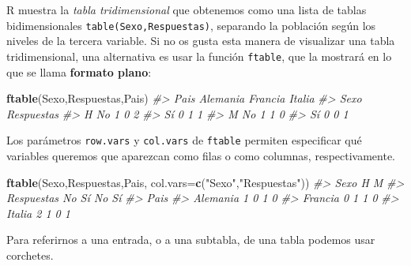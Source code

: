 \documentclass[
]{book}
\newenvironment{Shaded}{\begin{snugshade}}{\end{snugshade}}
\newcommand{\CommentTok}[1]{\textcolor[rgb]{0.56,0.35,0.01}{\textit{#1}}}
\newcommand{\DataTypeTok}[1]{\textcolor[rgb]{0.13,0.29,0.53}{#1}}
\newcommand{\KeywordTok}[1]{\textcolor[rgb]{0.13,0.29,0.53}{\textbf{#1}}}
\newcommand{\NormalTok}[1]{#1}
\newcommand{\StringTok}[1]{\textcolor[rgb]{0.31,0.60,0.02}{#1}}
\theoremstyle{definition}
\theoremstyle{definition}
\theoremstyle{definition}
\theoremstyle{remark}
\begin{document}
R muestra la \emph{tabla tridimensional} que obtenemos como una lista de tablas bidimensionales \texttt{table(Sexo,Respuestas)}, separando la población según los niveles de la tercera variable. Si no os gusta esta manera de visualizar una tabla tridimensional, una alternativa es usar la función \texttt{ftable}, que la mostrará en lo que se llama \textbf{formato plano}:

\begin{Shaded}
\begin{Highlighting}[]
\KeywordTok{ftable}\NormalTok{(Sexo,Respuestas,Pais)}
\CommentTok{\#\textgreater{}                 Pais Alemania Francia Italia}
\CommentTok{\#\textgreater{} Sexo Respuestas                             }
\CommentTok{\#\textgreater{} H    No                     1       0      2}
\CommentTok{\#\textgreater{}      Sí                     0       1      1}
\CommentTok{\#\textgreater{} M    No                     1       1      0}
\CommentTok{\#\textgreater{}      Sí                     0       0      1}
\end{Highlighting}
\end{Shaded}

Los parámetros \texttt{row.vars} y \texttt{col.vars} de \texttt{ftable} permiten especificar qué variables queremos que aparezcan como filas o como columnas, respectivamente.

\begin{Shaded}
\begin{Highlighting}[]
\KeywordTok{ftable}\NormalTok{(Sexo,Respuestas,Pais, }\DataTypeTok{col.vars=}\KeywordTok{c}\NormalTok{(}\StringTok{"Sexo"}\NormalTok{,}\StringTok{"Respuestas"}\NormalTok{))}
\CommentTok{\#\textgreater{}          Sexo        H     M   }
\CommentTok{\#\textgreater{}          Respuestas No Sí No Sí}
\CommentTok{\#\textgreater{} Pais                           }
\CommentTok{\#\textgreater{} Alemania             1  0  1  0}
\CommentTok{\#\textgreater{} Francia              0  1  1  0}
\CommentTok{\#\textgreater{} Italia               2  1  0  1}
\end{Highlighting}
\end{Shaded}

Para referirnos a una entrada, o a una subtabla, de una tabla podemos usar corchetes.
\end{document}
